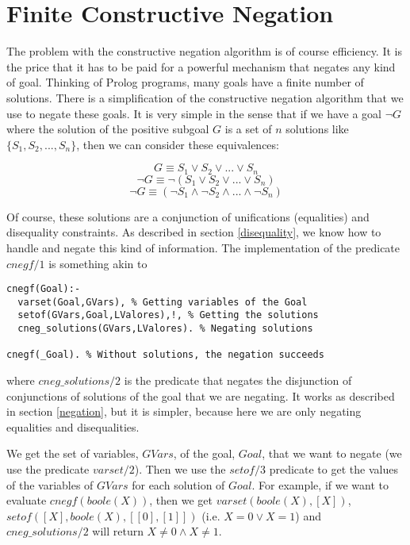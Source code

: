 \documentclass{llncs}
\begin{document}
 


\section{Finite Constructive Negation}
\label{cneg}

The problem with the constructive negation algorithm is of course
efficiency. It is the price that it has to be paid for a powerful
mechanism that negates any kind of goal. Thinking of Prolog programs,
many goals have a finite number of solutions. There is a
simplification of the constructive negation algorithm that we use to
negate these goals. It is very simple in the sense that if we have a
goal $\neg G$ where the solution of the positive subgoal $G$ is a set
of $n$ solutions like $\{S_1, S_2,...,S_n\}$, then we can consider
these equivalences:

$$G \equiv S_1 \vee S_2 \vee ... \vee S_n $$
$$\neg G \equiv \neg(S_1 \vee S_2 \vee ... \vee S_n) $$
$$\neg G \equiv (\neg S_1 \wedge \neg S_2 \wedge ... \wedge \neg S_n)$$

Of course, these solutions are a conjunction of unifications
(equalities) and disequality constraints. As described in section
\ref{disequality}, we know how to handle and negate this kind of
information. The implementation of the predicate $cnegf/1$ is
something akin to

\begin{verbatim}
cnegf(Goal):-
  varset(Goal,GVars), % Getting variables of the Goal
  setof(GVars,Goal,LValores),!, % Getting the solutions
  cneg_solutions(GVars,LValores). % Negating solutions

cnegf(_Goal). % Without solutions, the negation succeeds
\end{verbatim}

\noindent
where $cneg\_solutions/2$ is the predicate that negates the disjunction
of conjunctions of solutions of the goal that we are negating. It
works as described in section \ref{negation}, but it is simpler,
because here we are only negating equalities and disequalities.

We get the set of variables, $GVars$, of the goal, $Goal$, that we
want to negate (we use the predicate $varset/2$). Then we use the
$setof/3$ predicate to get the values of the variables of $GVars$
 for each solution of $Goal$. For example, if we want to
evaluate $cnegf(boole(X))$, then we get $varset(boole(X),[X])$,
$setof([X],boole(X),[[0],[1]])$ (i.e. $X=0 \vee X=1$) and
$cneg\_solutions/2$ will return $X \neq 0
\wedge X \neq 1$. 
\end{document}
